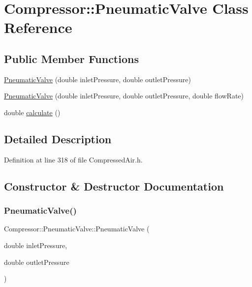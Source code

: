 \hypertarget{class_compressor_1_1_pneumatic_valve}{}\section{Compressor\+:\+:Pneumatic\+Valve Class Reference}
\label{class_compressor_1_1_pneumatic_valve}
\subsection*{Public Member Functions}
\begin{DoxyCompactItemize}
\item 
\hyperlink{class_compressor_1_1_pneumatic_valve_a8c883ff13640780f40d026984e9116f7}{Pneumatic\+Valve} (double inlet\+Pressure, double outlet\+Pressure)
\item 
\hyperlink{class_compressor_1_1_pneumatic_valve_adc3d621e933c23b13d1f20378704336b}{Pneumatic\+Valve} (double inlet\+Pressure, double outlet\+Pressure, double flow\+Rate)
\item 
double \hyperlink{class_compressor_1_1_pneumatic_valve_aa9e11ab6f1e75730519a69fccfaa53c2}{calculate} ()
\end{DoxyCompactItemize}


\subsection{Detailed Description}


Definition at line 318 of file Compressed\+Air.\+h.



\subsection{Constructor \& Destructor Documentation}
\mbox{\label{class_compressor_1_1_pneumatic_valve_a8c883ff13640780f40d026984e9116f7}} 
\subsubsection{\texorpdfstring{Pneumatic\+Valve()}{PneumaticValve()}\hspace{0.1cm}{\footnotesize\ttfamily [1/2]}}
{\footnotesize\ttfamily Compressor\+::\+Pneumatic\+Valve\+::\+Pneumatic\+Valve (\begin{DoxyParamCaption}\item[{double}]{inlet\+Pressure,  }\item[{double}]{outlet\+Pressure }\end{DoxyParamCaption})}

